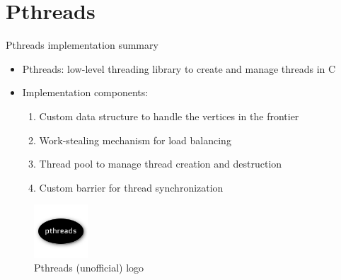 \section{Pthreads}
\begin{frame}{Pthreads implementation summary}
\begin{itemize}
  \item<1-> Pthreads: low-level threading library to create and manage threads in C
  \item<2-> Implementation components:
  \begin{enumerate}
    \item<2-> Custom data structure to handle the vertices in the frontier
    \item<3-> Work-stealing mechanism for load balancing
    \item<4-> Thread pool to manage thread creation and destruction
    \item<5-> Custom barrier for thread synchronization
  \end{enumerate}
\end{itemize}
\begin{figure}
  \centering
  \includegraphics[height=2cm, trim={0 1cm 0 1cm},clip]{images/pthreads.png}
  \caption{Pthreads (unofficial) logo}
\end{figure}
\end{frame}
